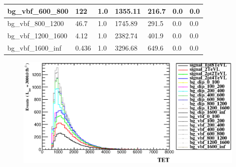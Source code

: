 \documentclass[a4paper, 10pt]{article}
\begin{document}
\begin{table}[H]
\begin{center}
\begin{tabular}{|m{23.0mm}|m{23.0mm}|m{18.0mm}|m{19.0mm}|m{19.0mm}|m{19.0mm}|m{19.0mm}|}
      \hline
      {\cellcolor{white}         bg\_vbf\_600\_800}& {\cellcolor{white}         122}& {\cellcolor{white}         1.0}& {\cellcolor{white}         1355.11}& {\cellcolor{white}         216.7}& {\cellcolor{green}         0.0}& {\cellcolor{green}         0.0}\\
      \hline
      {\cellcolor{white}         bg\_vbf\_800\_1200}& {\cellcolor{white}         46.7}& {\cellcolor{white}         1.0}& {\cellcolor{white}         1745.89}& {\cellcolor{white}         291.5}& {\cellcolor{green}         0.0}& {\cellcolor{green}         0.0}\\
      \hline
      {\cellcolor{white}         bg\_vbf\_1200\_1600}& {\cellcolor{white}         4.12}& {\cellcolor{white}         1.0}& {\cellcolor{white}         2382.74}& {\cellcolor{white}         401.9}& {\cellcolor{green}         0.0}& {\cellcolor{green}         0.0}\\
      \hline
      {\cellcolor{white}         bg\_vbf\_1600\_inf}& {\cellcolor{white}         0.436}& {\cellcolor{white}         1.0}& {\cellcolor{white}         3296.68}& {\cellcolor{white}         649.6}& {\cellcolor{green}         0.0}& {\cellcolor{green}         0.0}\\
\hline
    \end{tabular}
  \end{center}
\end{table}

\begin{figure}[H]
  \begin{center}
    \includegraphics[scale=0.45]{selection_14.eps}\\
\caption{   }
  \end{center}
\end{figure}
\newpage
\end{document}
